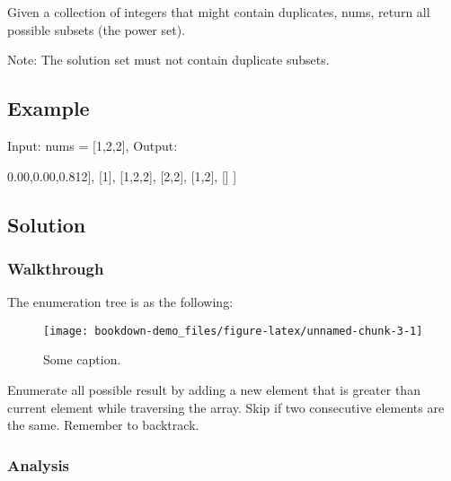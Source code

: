 \documentclass[]{book}
\newenvironment{Shaded}{\begin{snugshade}}{\end{snugshade}}
\newcommand{\DecValTok}[1]{\textcolor[rgb]{0.00,0.00,0.81}{#1}}
\newcommand{\NormalTok}[1]{#1}
\begin{document}
Given a collection of integers that might contain duplicates, nums, return all possible subsets (the power set).

Note: The solution set must not contain duplicate subsets.

\hypertarget{example-15}{%
\subsection{Example}\label{example-15}}

Input: nums = {[}1,2,2{]}, Output:

\begin{Shaded}
\begin{Highlighting}[]
\NormalTok{[}
\NormalTok{    [}\DecValTok{2}\NormalTok{],}
\NormalTok{    [}\DecValTok{1}\NormalTok{],}
\NormalTok{    [}\DecValTok{1}\NormalTok{,}\DecValTok{2}\NormalTok{,}\DecValTok{2}\NormalTok{],}
\NormalTok{    [}\DecValTok{2}\NormalTok{,}\DecValTok{2}\NormalTok{],}
\NormalTok{    [}\DecValTok{1}\NormalTok{,}\DecValTok{2}\NormalTok{],}
\NormalTok{    []}
\NormalTok{]}
\end{Highlighting}
\end{Shaded}

\hypertarget{solution-11}{%
\subsection{Solution}\label{solution-11}}

\hypertarget{walkthrough-15}{%
\subsubsection{Walkthrough}\label{walkthrough-15}}

The enumeration tree is as the following:

\begin{figure}
\texttt{[image: bookdown-demo\_files/figure-latex/unnamed-chunk-3-1]} \caption{Some caption.}\label{fig:unnamed-chunk-3}
\end{figure}

Enumerate all possible result by adding a new element that is greater than current element while traversing the array.
Skip if two consecutive elements are the same. Remember to backtrack.

\hypertarget{analysis-17}{%
\subsubsection{Analysis}\label{analysis-17}}
\end{document}
